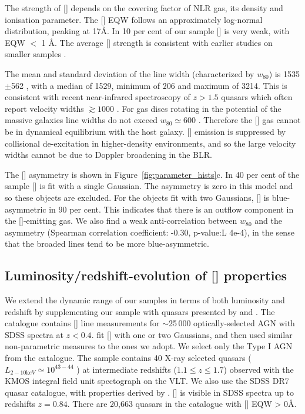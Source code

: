 The strength of [] depends on the covering factor of NLR gas, its density and ionisation parameter. 
The [] EQW follows an approximately log-normal distribution, peaking at 17\AA. 
In 10 per cent of our sample [] is very weak, with EQW $<$ 1 \AA. 
The average [] strength is consistent with earlier studies on smaller samples \citep[e.g.][]{sulentic04,netzer04,shen16a}.

The mean and standard deviation of the line width (characterized by $w_{80}$) is 1535$\pm$562 \kms, with a median of 1529, minimum of 206 and maximum of 3214. 
This is consistent with recent near-infrared spectroscopy of $z>1.5$ quasars which often report velocity widths $\gtrsim1000$ \kms \citep[e.g.][]{netzer04,kim13,brusa15,shen16a}. 
For gas discs rotating in the potential of the massive galaxies line widths do not exceed $w_{80}\simeq600$ \kms \citep{liu13}. 
Therefore the [] gas cannot be in dynamical equilibrium with the host galaxy. 
[] emission is suppressed by collisional de-excitation in higher-density environments, and so the large velocity widths cannot be due to Doppler broadening in the BLR. 

The [] asymmetry is shown in Figure~\ref{fig:parameter_hists}c. 
In 40 per cent of the sample [] is fit with a single Gaussian. 
The asymmetry is zero in this model and so these objects are excluded. 
For the objects fit with two Gaussians, [] is blue-asymmetric in 90 per cent. 
This indicates that there is an outflow component in the []-emitting gas. 
We also find a weak anti-correlation between $w_{80}$ and the asymmetry (Spearman correlation coefficient: -0.30, p-value:L 4e-4), in the sense that the broaded lines tend to be more blue-asymmetric.  

\subsection{Luminosity/redshift-evolution of [] properties}

We extend the dynamic range of our samples in terms of both luminosity and redshift by supplementing our sample with quasars presented by \citet{mullaney13} and \citet{harrison16}. 
The \citet{mullaney13} catalogue contains [] line measurements for $\sim$25\,000 optically-selected AGN with SDSS spectra at $z<0.4$.
\citet{mullaney13} fit [] with one or two Gaussians, and then used similar non-parametric measures to the ones we adopt.
We select only the Type I AGN from the \citet{mullaney13} catalogue. 
The \citet{harrison16} sample contains 40 X-ray selected quasars ($L_{2-10 {\mathrm keV}} \simeq 10^{43-44}$ \ergs) at intermediate redshifts ($1.1 \leq z \leq 1.7$) observed with the KMOS integral field unit spectograph on the VLT. 
We also use the SDSS DR7 quasar catalogue, with properties derived by \citet{shen11}. 
[] is visible in SDSS spectra up to redshifts $z=0.84$. 
There are 20,663 quasars in the \citet{shen11} catalogue with [] EQW > 0\AA. 

